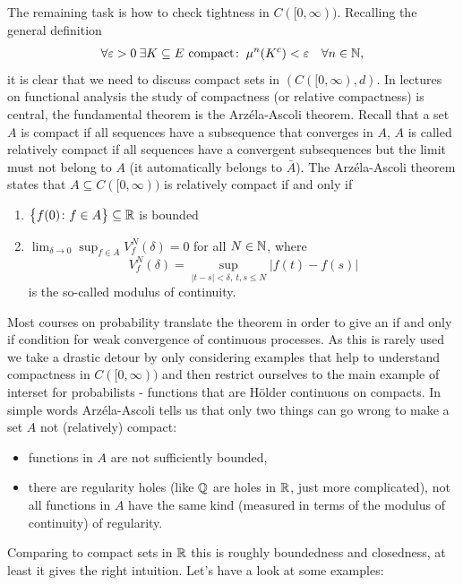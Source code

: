 The remaining task is how to check tightness in $C([0,\infty))$. Recalling the general definition
\begin{align*}
	\forall \varepsilon > 0 \: \exists K \subseteq E \text{ compact}\colon \: \mu^n(K^c) < \varepsilon \quad \forall n \in \mathbb{N},
\end{align*}
it is clear that we need to discuss compact sets in $(C([0,\infty),d)$. In lectures on functional analysis the study of compactness (or relative compactness) is central, the fundamental theorem is the Arz\'ela-Ascoli theorem. Recall that a set $A$ is compact if all sequences have a subsequence that converges in $A$, $A$ is called relatively compact if all sequences have a convergent subsequences but the limit must not belong to $A$ (it automatically belongs to $\bar A$). The Arz\'ela-Ascoli theorem states that $A \subseteq C([0,\infty))$ is relatively compact if and only if 
	\begin{enumerate}[label=(\roman*)]
		\item $\big\{ f(0)\colon f\in A\big\} \subseteq \mathbb{R}$ is bounded
		\item $\lim_{\delta \to 0} \sup_{f\in A} V_f^N(\delta) = 0 $ for all $N \in \mathbb{N}$, where $$V_f^N(\delta) = \sup_{\lvert t - s \rvert < \delta, \: t,s \leq N} \lvert f(t)- f(s) \rvert$$ is the so-called modulus of continuity.
	\end{enumerate}
Most courses on probability translate the theorem in order to give an if and only if condition for weak convergence of continuous processes. As this is rarely used we take a drastic detour by only considering examples that help to understand compactness in $C([0,\infty))$ and then restrict ourselves to the main example of interset for probabilists - functions that are H\"older continuous on compacts. In simple words Arz\'ela-Ascoli tells us that only two things can go wrong to make a set $A$ not (relatively) compact:
\begin{itemize}
	\item functions in $A$ are not sufficiently bounded,
 	\item there are regularity holes (like $\mathbb{Q}$ are holes in $\mathbb{R}$, just more complicated), not all functions in $A$ have the same kind (measured in terms of the modulus of continuity) of regularity.
\end{itemize}
Comparing to compact sets in $\mathbb{R}$ this is roughly boundedness and closedness, at least it gives the right intuition. Let's have a look at some examples:
